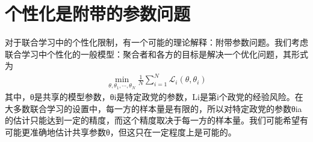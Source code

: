 \section{个性化是附带的参数问题}
对于联合学习中的个性化限制，有一个可能的理论解释：附带参数问题。我们考虑联合学习中个性化的一般模型：聚合者和各方的目标是解决一个优化问题，其形式为
\begin{align}\label{eq:4-27}
	\min_{\theta, \theta_{1}, \cdots, \theta_{N}} \frac{1}{N} \sum_{i=1}^{N} \mathcal{L}_{i}(\theta, \theta_{i})
\end{align}
其中，θ是共享的模型参数，θi是特定政党的参数，Li是第i个政党的经验风险。在大多数联合学习的设置中，每一方的样本量是有限的，所以对特定政党的参数θia的估计只能达到一定的精度，而这个精度取决于每一方的样本量。我们可能希望有可能更准确地估计共享参数θ，但这只在一定程度上是可能的。

